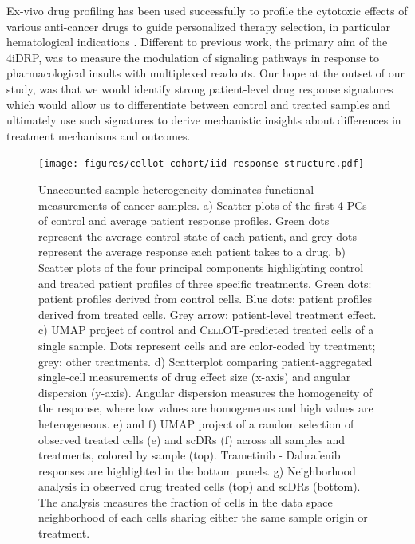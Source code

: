 Ex-vivo drug profiling has been used successfully to profile the cytotoxic effects of various anti-cancer drugs to guide personalized therapy selection, in particular hematological indications \cite{liebers2023, kropivsek2023}.
Different to previous work, the primary aim of the 4iDRP, was to measure the modulation of signaling pathways in response to pharmacological insults with multiplexed readouts.
Our hope at the outset of our study, was that we would identify strong patient-level drug response signatures which would allow us to differentiate between control and treated samples and ultimately use such signatures to derive mechanistic insights about differences in treatment mechanisms and outcomes.  

\begin{figure}[htp!]
  \begin{center}
    \texttt{[image: figures/cellot-cohort/iid-response-structure.pdf]}
  \end{center}
  \caption{Unaccounted sample heterogeneity dominates functional measurements of cancer samples. a) Scatter plots of the first 4 PCs of control and average patient response profiles. Green dots represent the average control state of each patient, and grey dots represent the average response each patient takes to a drug.
  b) Scatter plots of the four principal components highlighting control and treated patient profiles of three specific treatments. Green dots: patient profiles derived from control cells. Blue dots: patient profiles derived from treated cells. Grey arrow: patient-level treatment effect.
  c) UMAP project of control and \textsc{CellOT}-predicted treated cells of a single sample. Dots represent cells and are color-coded by treatment; grey: other treatments.
  d) Scatterplot comparing patient-aggregated single-cell measurements of drug effect size (x-axis) and angular dispersion (y-axis). Angular dispersion measures the homogeneity of the response, where low values are homogeneous and high values are heterogeneous.
  e) and f) UMAP project of a random selection of observed treated cells (e) and scDRs (f) across all samples and treatments, colored by sample (top). Trametinib - Dabrafenib responses are highlighted in the bottom panels.
  g) Neighborhood analysis in observed drug treated cells (top) and scDRs (bottom). The analysis measures the fraction of cells in the data space neighborhood of each cells sharing either the same sample origin or treatment.
 }
  \label{fig:iid-structure}
\end{figure}

